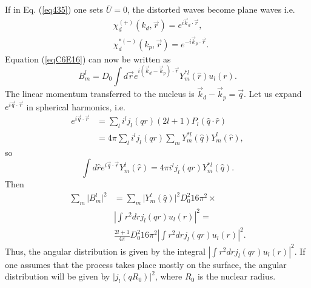 If in Eq. (\ref{eq435}) one sets $\bar U=0$, the distorted waves become plane waves i.e.
 \begin{subequations}
\begin{align}\label{eq437}
&\chi^{(+)}_d(k_d,\vec r)=e^{i \vec k_d \cdot \vec r},\\
&\chi^{*(-)}_d(k_p,\vec r)=e^{-i \vec k_p \cdot \vec r}.
\end{align}
\end{subequations}
Equation (\ref{eqC6E16}) can now be written as
\begin{equation}\label{eq438}
B_{m}^l=D_0 \int d\vec r e^{i (\vec k_d-\vec k_p) \cdot \vec r} Y_m^{*l}(\hat r) u_{l}(r).
\end{equation}
The linear momentum transferred to the nucleus is $\vec k_d-\vec k_p=\vec q$.
Let us expand $e^{i \vec q \cdot \vec r}$ in spherical harmonics, i.e.
\begin{equation}\label{eq439}
\begin{split}
 e^{i \vec q \cdot \vec r}&=\sum_l i^l j_l(qr)(2l+1)P_l(\hat q \cdot \hat r)\\
& =4 \pi \sum_l i^l j_l(qr)\sum_m Y_m^{*l}(\hat q) Y_m^{l}(\hat r),
\end{split}
\end{equation}
so
\begin{equation}\label{eq440}
 \int d\hat r e^{i \vec q \cdot \vec r} Y_m^{l}(\hat r)= 4 \pi i^l j_l(qr) Y_m^{*l}(\hat q).
\end{equation}
Then
\begin{equation}\label{eq441}
\begin{split}
 \sum_{m} \vert B_{m}^l\vert^2 & = \sum_{m} \vert Y_m^{l}(\hat q)\vert^2 D_0^2 16 \pi^2 \times \\
& \left \vert \int r^2 dr j_l(qr) u_l(r) \right \vert ^2=\\
& \frac{2l+1}{4 \pi} D_0^2 16 \pi^2 \left \vert \int r^2 dr j_l(qr) u_l(r) \right \vert ^2.
\end{split}
\end{equation}
Thus, the angular distribution is given by the integral $\left \vert \int r^2 dr j_l(qr) u_l(r) \right \vert ^2$. If one assumes that the process takes place mostly on the surface, the angular distribution will be given by $ \vert j_l(qR_0) \vert ^2$, where $R_0$ is the nuclear radius.

